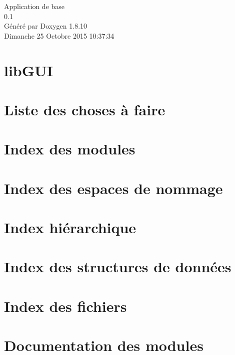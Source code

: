 \documentclass[twoside]{book}
\newcommand{\+}{\discretionary{\mbox{\scriptsize$\hookleftarrow$}}{}{}}
\newcommand{\clearemptydoublepage}{%
  \newpage{\pagestyle{empty}\cleardoublepage}%
}
\begin{document}
\begin{titlepage}
\vspace*{7cm}
\begin{center}%
{\Large Application de base \\[1ex]\large 0.\+1 }\\
\vspace*{1cm}
{\large Généré par Doxygen 1.8.10}\\
\vspace*{0.5cm}
{\small Dimanche 25 Octobre 2015 10:37:34}\\
\end{center}
\end{titlepage}
\clearemptydoublepage
\tableofcontents
\clearemptydoublepage
{}

\chapter{lib\+G\+U\+I}
\label{md__interface__r_e_a_d_m_e}

\chapter{Liste des choses à faire}
\label{todo}

\chapter{Index des modules}

\chapter{Index des espaces de nommage}

\chapter{Index hiérarchique}

\chapter{Index des structures de données}

\chapter{Index des fichiers}

\chapter{Documentation des modules}


\end{document}
